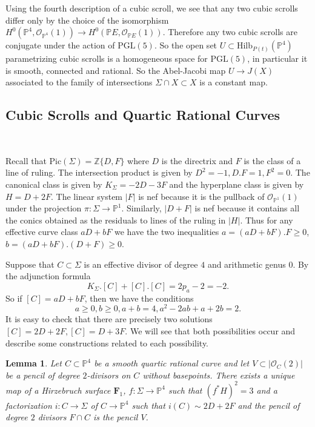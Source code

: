 \documentclass[amssymb,twoside,12 pt,amscd,reqno]{amsart}
\theoremstyle{plain}
\newtheorem{lem}[thm]{Lemma}
\theoremstyle{definition}
\newcommand{\ZZ}{\mathbb{Z}}
\newcommand{\PP}{\mathbb{P}}
\def\ps{\vspace{4pt}}
\newcommand{\OO}{\mathcal O}
\begin{document}
\ps

Using the fourth description of a cubic scroll, we see that any two
cubic scrolls differ only by the choice of the isomorphism
$H^0(\PP^4,\OO_{\PP^4}(1)) \rightarrow H^0(\PP E,\OO_{\PP E}(1))$.
Therefore any two cubic scrolls are
conjugate under the action of $\text{PGL}(5)$.  So the open set
$U\subset \text{Hilb}_{P(t)}(\PP^4)$ parametrizing cubic scrolls is a
homogeneous space for 
$\text{PGL}(5)$, in particular it is smooth, connected and rational.
So the Abel-Jacobi map $U\rightarrow J(X)$ associated to the family of
intersections $\Sigma\cap X\subset X$ is a constant map.  

\subsection{Cubic Scrolls and Quartic Rational
Curves}~\label{subsec-scr40}

Recall that $\text{Pic}(\Sigma) = \ZZ\{D,F\}$ where $D$ is the
directrix and $F$ is the class of a line of ruling.  The intersection
product is given by $D^2 = -1, D.F = 1, F^2 =0$.  The canonical
class is given by $K_\Sigma = -2D-3F$ and the hyperplane class is
given by $H=D+2F$.  The linear system $|F|$ is nef because it is the
pullback of $\OO_{\PP^1}(1)$ under the projection
$\pi:\Sigma\rightarrow \PP^1$.  Similarly, $|D+F|$ is nef because it
contains all the conics obtained as the residuals to lines of the
ruling in $|H|$.  Thus for any effective curve class $aD+bF$ we have
the two inequalities $a=(aD+bF).F \geq 0$, $b=(aD+bF).(D+F) \geq 0$.  

\ps

Suppose that $C\subset \Sigma$ is an effective
divisor of degree $4$ and arithmetic genus $0$.  By the adjunction
formula 
\begin{equation}
K_\Sigma.[C] + [C].[C] = 2p_a - 2 = -2.
\end{equation}
So if $[C]=aD+bF$, then we have the conditions
\begin{equation}
a\geq 0, b\geq 0, a+b = 4, a^2 -2ab +a+2b = 2.
\end{equation}
It is easy to check that there are precisely two solutions $[C]=2D+2F,
[C]=D+3F$.  We will see that both possibilities occur and describe
some constructions related to each possibility.

\ps

\begin{lem}\label{lem-g1240}  Let $C\subset \PP^4$ be a smooth quartic 
rational curve and let $V\subset |\OO_C(2)|$ be a pencil of degree
$2$-divisors on $C$ without basepoints.  There exists a unique map of a
Hirzebruch surface $\mathbf{F}_1$, $f:\Sigma\rightarrow \PP^4$ such
that $(f^* H)^2=3$  
and a factorization $i:C\rightarrow \Sigma$ of $C\rightarrow \PP^4$
such that $i(C)\sim 2D+2F$ and the pencil of degree $2$ divisors
$F\cap C$ is the pencil $V$.
\end{lem}
\end{document}
